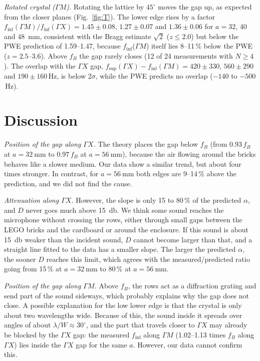 \documentclass[9pt,a4paper,twocolumn]{extarticle}
\newcommand{\umm}{\milli\metre}
\newcommand{\udB}{\decibel}
\newcommand{\GX}{\ensuremath{\Gamma X}}
\newcommand{\GM}{\ensuremath{\Gamma M}}
\newcommand{\finf}{\ensuremath{f_{\mathrm{inf}}}}
\newcommand{\fsup}{\ensuremath{f_{\mathrm{sup}}}}
\begin{document}
\emph{Rotated crystal (\GM).} Rotating the lattice by $45^\circ$ moves the gap up, as expected from the
closer planes (Fig.~\ref{fig:T}). The lower edge rises by a factor
$\finf(\GM)/\finf(\GX)=1.45\pm0.08$, $1.27\pm0.07$ and $1.36\pm0.06$ for $a=32$, 40 and \SI{48}{\umm}, consistent with
the Bragg estimate $\sqrt2$ ($z\le2.0$) but below the PWE prediction of 1.59--1.47, because \finf(\GM) itself
lies 8--11\,\% below the PWE ($z=2.5$--3.6). Above $f_B$ the gap rarely closes (12 of 24 measurements with
$N\ge4$). The overlap with the \GX{} gap,
$\fsup(\GX)-\finf(\GM)=420\pm330$, $560\pm290$ and $190\pm160$\,Hz, is below $2\sigma$, while the PWE
predicts no overlap ($-140$ to $-500$\,Hz).


\section{Discussion}
\emph{Position of the gap along \GX.} The theory places the gap below $f_B$ (from $0.93\,f_B$ at $a=\SI{32}{\umm}$ to $0.97\,f_B$ at $a=\SI{56}{\umm}$), because the air flowing around the bricks behaves like a slower medium. Our data show a similar trend, but about four times stronger. In contrast, for $a=\SI{56}{\umm}$ both edges are 9--14\,\% above the prediction, and we did not find the cause.

\emph{Attenuation along \GX.} However, the slope is only 15 to 80\,\% of the predicted $\alpha$, and $D$ never goes much above \SI{15}{\udB}. We think some sound reaches the microphone without crossing the rows, either through small gaps between the LEGO bricks and the cardboard or around the enclosure. If this sound is about \SI{15}{\udB} weaker than the incident sound, $D$ cannot become larger than that, and a straight line fitted to the data has a smaller slope. The larger the predicted $\alpha$, the sooner $D$ reaches this limit, which agrees with the measured/predicted ratio going from 15\,\% at $a=\SI{32}{\umm}$ to 80\,\% at $a=\SI{56}{\umm}$.

\emph{Position of the gap along \GM.} Above $f_B$, the rows act as a diffraction grating and send part of the sound sideways, which probably explains why the gap does not close. A possible explanation for the low lower edge is that the crystal is only about two wavelengths wide. Because of this, the sound inside it spreads over angles of about $\lambda/W\approx30^\circ$, and the part that travels closer to \GX{} may already be blocked by the \GX{} gap: the measured \finf{} along \GM{} (1.02--1.13 times $f_B$ along \GX) lies inside the \GX{} gap for the same $a$. However, our data cannot confirm this.
\end{document}

